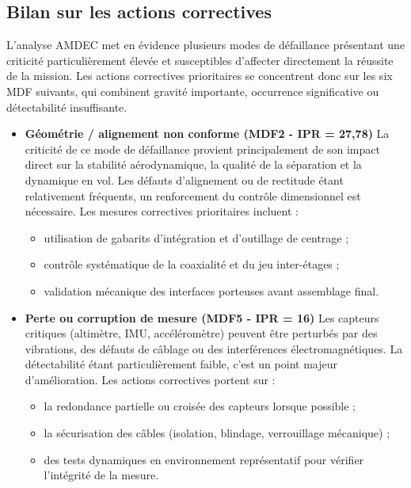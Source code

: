 \subsection{Bilan sur les actions correctives}
\label{subsec:bilan_action_corr}

L’analyse \acrshort{AMDEC} met en évidence plusieurs modes de défaillance présentant une criticité particulièrement élevée et
susceptibles d’affecter directement la réussite de la mission. Les actions correctives prioritaires se concentrent donc sur les
six \acrshort{MDF} suivants, qui combinent gravité importante, occurrence significative ou détectabilité insuffisante.\\
\begin{itemize}
    \item \textbf{Géométrie / alignement non conforme (MDF2 - IPR = 27,78)} \newline
    La criticité de ce mode de défaillance provient principalement de son impact direct sur la stabilité aérodynamique, la
    qualité de la séparation et la dynamique en vol. Les défauts d’alignement ou de rectitude étant relativement fréquents, un
    renforcement du contrôle dimensionnel est nécessaire. Les mesures correctives prioritaires incluent :
    \begin{itemize}
        \item utilisation de gabarits d’intégration et d’outillage de centrage ;
        \item contrôle systématique de la coaxialité et du jeu inter-étages ;
        \item validation mécanique des interfaces porteuses avant assemblage final.\\
    \end{itemize}
    \item \textbf{Perte ou corruption de mesure (MDF5 - IPR = 16)} \newline
    Les capteurs critiques (altimètre, IMU, accéléromètre) peuvent être perturbés par des vibrations, des défauts de câblage ou
    des interférences électromagnétiques. La détectabilité étant particulièrement faible, c’est un point majeur d'amélioration.
    Les actions correctives portent sur :
    \begin{itemize}
        \item la redondance partielle ou croisée des capteurs lorsque possible ;
        \item la sécurisation des câbles (isolation, blindage, verrouillage mécanique) ;
        \item des tests dynamiques en environnement représentatif pour vérifier l’intégrité de la mesure.\\

\end{itemize}
\end{itemize}
